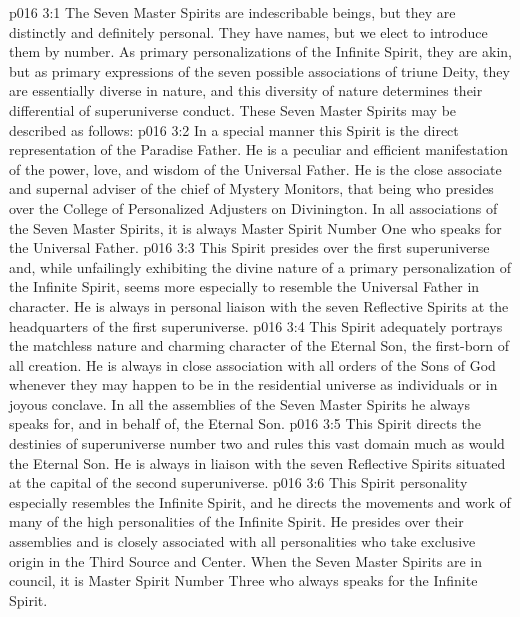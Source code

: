 \vs p016 3:1 The Seven Master Spirits are indescribable beings, but they are distinctly and definitely personal. They have names, but we elect to introduce them by number. As primary personalizations of the Infinite Spirit, they are akin, but as primary expressions of the seven possible associations of triune Deity, they are essentially diverse in nature, and this diversity of nature determines their differential of superuniverse conduct. These Seven Master Spirits may be described as follows:
\vs p016 3:2  In a special manner this Spirit is the direct representation of the Paradise Father. He is a peculiar and efficient manifestation of the power, love, and wisdom of the Universal Father. He is the close associate and supernal adviser of the chief of Mystery Monitors, that being who presides over the College of Personalized Adjusters on Divinington. In all associations of the Seven Master Spirits, it is always Master Spirit Number One who speaks for the Universal Father.
\vs p016 3:3 This Spirit presides over the first superuniverse and, while unfailingly exhibiting the divine nature of a primary personalization of the Infinite Spirit, seems more especially to resemble the Universal Father in character. He is always in personal liaison with the seven Reflective Spirits at the headquarters of the first superuniverse.
\vs p016 3:4 \pc {} This Spirit adequately portrays the matchless nature and charming character of the Eternal Son, the first\hyp{}born of all creation. He is always in close association with all orders of the Sons of God whenever they may happen to be in the residential universe as individuals or in joyous conclave. In all the assemblies of the Seven Master Spirits he always speaks for, and in behalf of, the Eternal Son.
\vs p016 3:5 This Spirit directs the destinies of superuniverse number two and rules this vast domain much as would the Eternal Son. He is always in liaison with the seven Reflective Spirits situated at the capital of the second superuniverse.
\vs p016 3:6 \pc {} This Spirit personality especially resembles the Infinite Spirit, and he directs the movements and work of many of the high personalities of the Infinite Spirit. He presides over their assemblies and is closely associated with all personalities who take exclusive origin in the Third Source and Center. When the Seven Master Spirits are in council, it is Master Spirit Number Three who always speaks for the Infinite Spirit.
